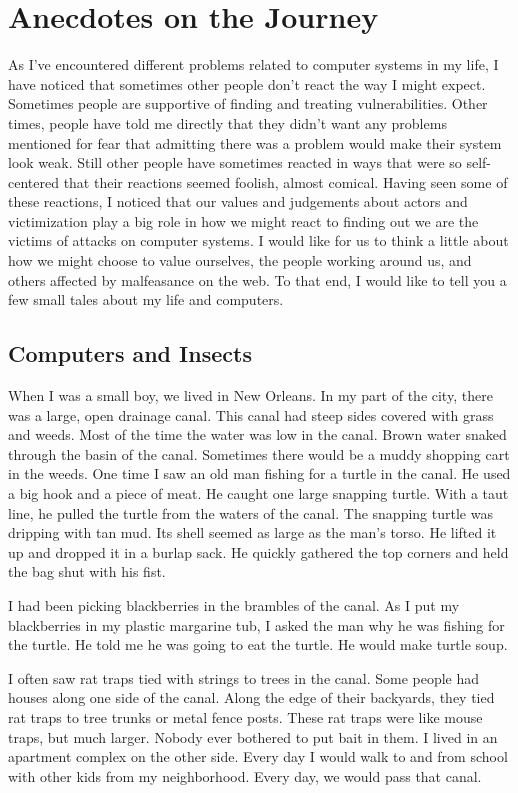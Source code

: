 \chapter{Anecdotes on the Journey}

As I've encountered different problems related to computer systems in my life, I have noticed that sometimes other people don't react the way I might expect.  Sometimes people are supportive of finding and treating vulnerabilities.  Other times, people have told me directly that they didn't want any problems mentioned for fear that admitting there was a problem would make their system look weak.  Still other people have sometimes reacted in ways that were so self-centered that their reactions seemed foolish, almost comical.  Having seen some of these reactions, I noticed that our values and judgements about actors and victimization play a big role in how we might react to finding out we are the victims of attacks on computer systems.  I would like for us to think a little about how we might choose to value ourselves, the people working around us, and others affected by malfeasance on the web.  To that end, I would like to tell you a few small tales about my life and computers.

\section{Computers and Insects}

When I was a small boy, we lived in New Orleans.  In my part of the city, there was a large, open drainage canal.  This canal had steep sides covered with grass and weeds.  Most of the time the water was low in the canal.  Brown water snaked through the basin of the canal.  Sometimes there would be a muddy shopping cart in the weeds.  One time I saw an old man fishing for a turtle in the canal.  He used a big hook and a piece of meat.  He caught one large snapping turtle.  With a taut line, he pulled the turtle from the waters of the canal.  The snapping turtle was dripping with tan mud.  Its shell seemed as large as the man's torso.  He lifted it up and dropped it in a burlap sack.  He quickly gathered the top corners and held the bag shut with his fist.

I had been picking blackberries in the brambles of the canal.  As I put my blackberries in my plastic margarine tub, I asked the man why he was fishing for the turtle.  He told me he was going to eat the turtle.  He would make turtle soup.

I often saw rat traps tied with strings to trees in the canal.  Some people had houses along one side of the canal.  Along the edge of their backyards, they tied rat traps to tree trunks or metal fence posts.  These rat traps were like mouse traps, but much larger. Nobody ever bothered to put bait in them.  I lived in an apartment complex on the other side.  Every day I would walk to and from school with other kids from my neighborhood.  Every day, we would pass that canal.

